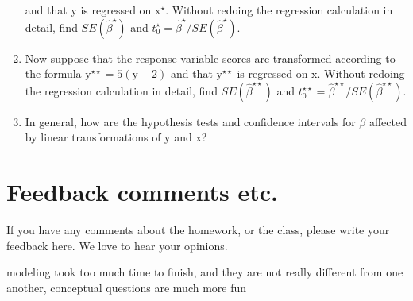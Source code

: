 \documentclass[]{article}
\begin{document}
\begin{enumerate}
  and that \(\mathrm{y}\) is regressed on \(\mathrm{x}^{\star}\).
  Without redoing the regression calculation in detail, find
  \(SE(\hat{\beta}^{\star})\) and
  \(t^{\star}_0= \hat{\beta}^{\star}/SE(\hat{\beta}^{\star})\).
\item
  Now suppose that the response variable scores are transformed
  according to the formula \(\mathrm{y}^{\star\star}=5(\mathrm{y}+2)\)
  and that \(\mathrm{y}^{\star\star}\) is regressed on \(\mathrm{x}\).
  Without redoing the regression calculation in detail, find
  \(SE(\hat{\beta}^{\star\star})\) and
  \(t^{\star\star}_0= \hat{\beta}^{\star\star}/SE(\hat{\beta}^{\star\star})\).
\item
  In general, how are the hypothesis tests and confidence intervals for
  \(\beta\) affected by linear transformations of \(\mathrm{y}\) and
  \(\mathrm{x}\)?
\end{enumerate}

\hypertarget{feedback-comments-etc.}{%
\section{Feedback comments etc.}\label{feedback-comments-etc.}}

If you have any comments about the homework, or the class, please write
your feedback here. We love to hear your opinions.

modeling took too much time to finish, and they are not really different
from one another, conceptual questions are much more fun
\end{document}
